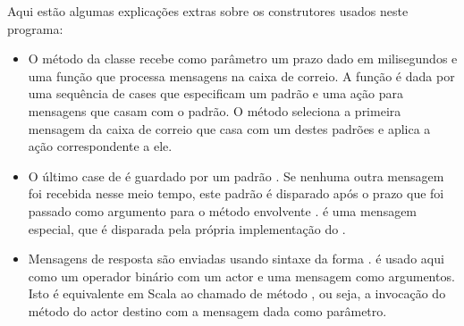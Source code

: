 Aqui estão algumas explicações extras sobre os construtores usados neste programa:
\begin{itemize}
\item
O método  da classe  recebe como parâmetro um prazo dado
em milisegundos e uma função que processa mensagens na caixa de correio. A função é dada
por uma sequência de cases que especificam um padrão e uma ação para mensagens que 
casam com o padrão. O método  seleciona a primeira mensagem da 
caixa de correio que casa com um destes padrões e aplica a ação correspondente a ele. 


\item
O último case de  é guardado por um padrão .  
Se nenhuma outra mensagem foi recebida nesse meio tempo, este padrão é disparado
após o prazo que foi passado como argumento para o método envolvente .
 é uma mensagem especial, que é disparada pela própria implementação do 
.    

\item
Mensagens de resposta são enviadas usando sintaxe da forma .
\code{!} é usado aqui como um operador binário com um actor e uma mensagem como argumentos.
Isto é equivalente em Scala ao chamado de método , ou seja, 
a invocação do método \code{!} do actor destino com a mensagem dada como parâmetro.
\end{itemize}    

